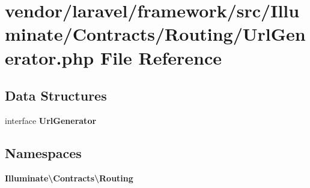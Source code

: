\section{vendor/laravel/framework/src/\+Illuminate/\+Contracts/\+Routing/\+Url\+Generator.php File Reference}
\label{laravel_2framework_2src_2_illuminate_2_contracts_2_routing_2_url_generator_8php}
\subsection*{Data Structures}
\begin{DoxyCompactItemize}
\item 
interface {\bf Url\+Generator}
\end{DoxyCompactItemize}
\subsection*{Namespaces}
\begin{DoxyCompactItemize}
\item 
 {\bf Illuminate\textbackslash{}\+Contracts\textbackslash{}\+Routing}
\end{DoxyCompactItemize}

